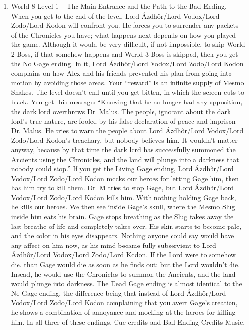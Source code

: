 \documentclass{gd-document}
\begin{document}
\begin{enumerate}
    \begin{enumerate}
    \item World 8 Level 1 – The Main Entrance and the Path to the Bad
      Ending. When you get to the end of the level, Lord Ázdhôr/Lord
      Vodox/Lord Zodo/Lord Kodon will confront you. He forces you to
      surrender any packets of the Chronicles you have; what happens
      next depends on how you played the game. Although it would be
      very difficult, if not impossible, to skip World 2 Boss, if that
      somehow happens and World 3 Boss is skipped, then you get the No
      Gage ending. In it, Lord Ázdhôr/Lord Vodox/Lord Zodo/Lord Kodon
      complains on how Alex and his friends prevented his plan from
      going into motion by avoiding those areas. Your “reward” is an
      infinite supply of Mesmo Snakes. The level doesn't end until you
      get bitten, in which the screen cuts to black. You get this
      message: “Knowing that he no longer had any opposition, the dark
      lord overthrows Dr. Malus. The people, ignorant about the dark
      lord's true nature, are fooled by his false declaration of peace
      and imprison Dr. Malus. He tries to warn the people about Lord
      Ázdhôr/Lord Vodox/Lord Zodo/Lord Kodon's treachary, but nobody
      believes him. It wouldn't matter anyway, because by that time
      the dark lord has successfully summoned the Ancients using the
      Chronicles, and the land will plunge into a darkness that nobody
      could stop.” If you get the Living Gage ending, Lord Ázdhôr/Lord
      Vodox/Lord Zodo/Lord Kodon mocks our heroes for letting Gage
      him, then has him try to kill them. Dr. M tries to stop Gage,
      but Lord Ázdhôr/Lord Vodox/Lord Zodo/Lord Kodon kills him. With
      nothing holding Gage back, he kills our heroes. We then see
      inside Gage's skull, where the Mesmo Slug inside him eats his
      brain. Gage stops breathing as the Slug takes away the last
      breathe of life and completely takes over. His skin starts to
      become pale, and the color in his eyes disappears. Nothing
      anyone could say would have any affect on him now, as his mind
      became fully subservient to Lord Ázdhôr/Lord Vodox/Lord
      Zodo/Lord Kodon. If the Lord were to somehow die, than Gage
      would die as soon as he finds out; but the Lord wouldn't
      die. Insead, he would use the Chronicles to summon the Ancients,
      and the land would plunge into darkness. The Dead Gage ending is
      almost identical to the No Gage ending, the difference being
      that instead of Lord Ázdhôr/Lord Vodox/Lord Zodo/Lord Kodon
      complaining that you avert Gage's creation, he shows a
      combination of annoyance and mocking at the heroes for killing
      him. In all three of these endings, Cue credits and Bad Ending
      Credits Music.


\end{enumerate}
\end{enumerate}
\end{document}
